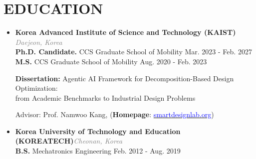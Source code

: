 \documentclass[a4paper,10pt]{article}
\begin{document}
\section*{EDUCATION}
\begin{itemize}[left=0pt]
    \item \textbf{Korea Advanced Institute of Science and Technology (KAIST)}   \hfill \textit{\textcolor{gray}{Daejeon, Korea}} \\
    \textbf{Ph.D. Candidate.} CCS Graduate School of Mobility                   \hfill Mar. 2023 - Feb. 2027 \\
    \textbf{M.S.} CCS Graduate School of Mobility                               \hfill Aug. 2020 - Feb. 2023 \\
    \begin{minipage}{\linewidth}
    \vspace{2pt}
    \hspace{5pt}\textbf{Dissertation:} Agentic AI Framework for Decomposition-Based Design Optimization: \\
    \hspace{5pt}from Academic Benchmarks to Industrial Design Problems
    \end{minipage}
    \begin{minipage}{\linewidth}
    \vspace{2pt}
    \hspace{5pt}Advisor: Prof. Namwoo Kang, (\textbf{Homepage}: \href{https://www.smartdesignlab.org/}{\textcolor{blue}{smartdesignlab.org}})
    \end{minipage}
    \item \textbf{Korea University of Technology and Education (KOREATECH)}\hfill \textit{\textcolor{gray}{Cheonan, Korea}} \\
    \textbf{B.S.} Mechatronics Engineering                                      \hfill Feb. 2012 - Aug. 2019
\end{itemize}
\end{document}
